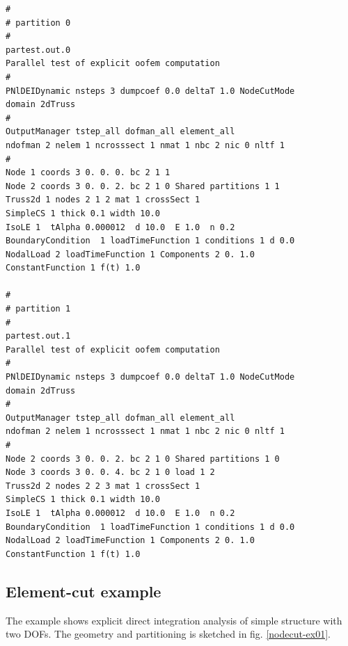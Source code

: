 \documentclass[a4paper]{article}
\begin{document}
\begin{verbatim}
#
# partition 0
#
partest.out.0
Parallel test of explicit oofem computation
#
PNlDEIDynamic nsteps 3 dumpcoef 0.0 deltaT 1.0 NodeCutMode
domain 2dTruss
#
OutputManager tstep_all dofman_all element_all
ndofman 2 nelem 1 ncrosssect 1 nmat 1 nbc 2 nic 0 nltf 1
#
Node 1 coords 3 0. 0. 0. bc 2 1 1 
Node 2 coords 3 0. 0. 2. bc 2 1 0 Shared partitions 1 1
Truss2d 1 nodes 2 1 2 mat 1 crossSect 1
SimpleCS 1 thick 0.1 width 10.0
IsoLE 1  tAlpha 0.000012  d 10.0  E 1.0  n 0.2  
BoundaryCondition  1 loadTimeFunction 1 conditions 1 d 0.0
NodalLoad 2 loadTimeFunction 1 Components 2 0. 1.0
ConstantFunction 1 f(t) 1.0

#
# partition 1
#
partest.out.1
Parallel test of explicit oofem computation
#
PNlDEIDynamic nsteps 3 dumpcoef 0.0 deltaT 1.0 NodeCutMode
domain 2dTruss
#
OutputManager tstep_all dofman_all element_all
ndofman 2 nelem 1 ncrosssect 1 nmat 1 nbc 2 nic 0 nltf 1
#
Node 2 coords 3 0. 0. 2. bc 2 1 0 Shared partitions 1 0
Node 3 coords 3 0. 0. 4. bc 2 1 0 load 1 2 
Truss2d 2 nodes 2 2 3 mat 1 crossSect 1
SimpleCS 1 thick 0.1 width 10.0
IsoLE 1  tAlpha 0.000012  d 10.0  E 1.0  n 0.2  
BoundaryCondition  1 loadTimeFunction 1 conditions 1 d 0.0
NodalLoad 2 loadTimeFunction 1 Components 2 0. 1.0
ConstantFunction 1 f(t) 1.0
\end{verbatim}

\subsection{Element-cut example}
The example shows explicit direct integration analysis of
simple structure with two DOFs. The geometry and partitioning is sketched in
fig. \ref{nodecut-ex01}. 
\end{document}
